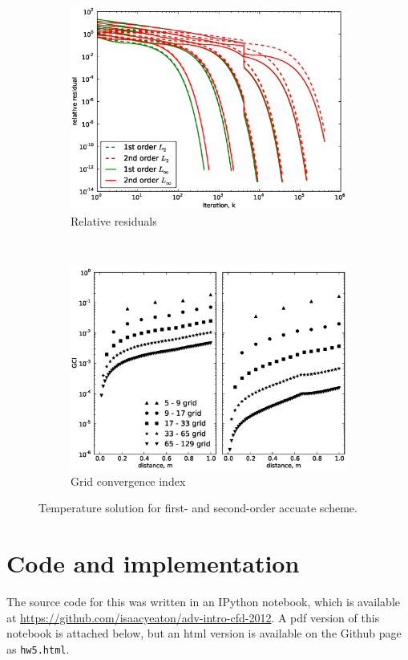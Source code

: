 \documentclass[11pt, letterpaper]{article}
\begin{document}
\begin{figure}
	\centering
	\begin{subfigure}[b]{0.475\textwidth}
		\centering
		\includegraphics[width=\textwidth]{./figs/p2-relresid.eps}
		\caption{Relative residuals}
		\label{fig:p2_relresid}
	\end{subfigure}
	~
	\begin{subfigure}[b]{0.475\textwidth}
		\centering
		\includegraphics[width=\textwidth]{./figs/p2_gci.eps}
		\caption{Grid convergence index}
		\label{fig:p2_gci}
	\end{subfigure}
	\caption{Temperature solution for first- and second-order accuate scheme.}
\end{figure}

\clearpage
\section{Code and implementation}

The source code for this was written in an IPython notebook, which
is available at \url{https://github.com/isaacyeaton/adv-intro-cfd-2012}.  A pdf
version of this notebook is attached below, but an html version is available
on the Github page as \texttt{hw5.html}.


\end{document}
